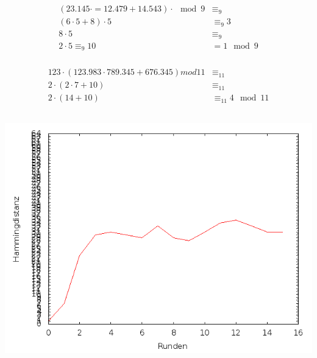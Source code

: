 \subsection{}
\subsubsection{}
\begin{align*}
 ( 23.145 \cdot = 12.479 + 14.543 ) \cdot \mod 9 & \equiv_9 \\
 ( 6 \cdot 5 + 8 ) \cdot 5 & \equiv_9  3				    \\
 8 \cdot 5 &\equiv_9 \\
 2\cdot 5 \equiv_9 10 &= 1 \mod 9 
\end{align*}

\subsubsection{}
\begin{align*}
 123 \cdot  (123.983 \cdot 789.345 + 676.345) mod 11 & \equiv_{11} \\
 2    \cdot  (2 \cdot 7 + 10) & \equiv_{11}   \\
 2 \cdot (14 + 10 ) & \equiv_{11}  4 \mod 11
\end{align*}


\subsection{}

\begin{center}
	\includegraphics[scale=0.5]{ueb1_4.png}
\end{center}

